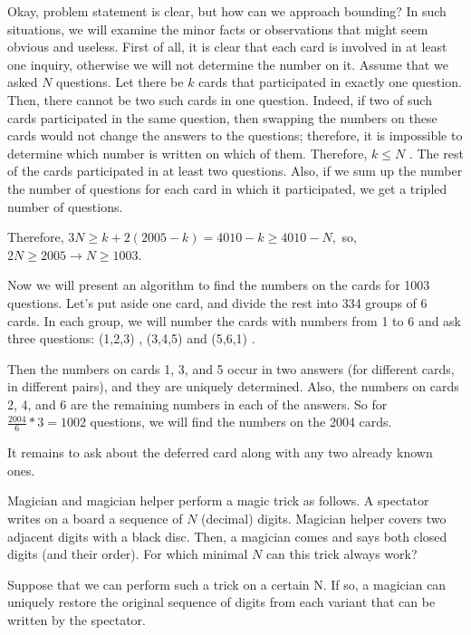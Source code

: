 \sol Okay, problem statement is clear, but how can we approach bounding? In such situations, we will examine the minor facts or observations that might seem obvious and useless. First of all, it is clear that each card is involved in at least one inquiry, otherwise we will not determine the number on it. Assume that we asked $N$ questions. Let there be $k$ cards that participated in exactly one question. Then, there cannot be two such cards in one question. Indeed, if two of such cards participated in the same question, then swapping the numbers on these cards would not change the answers to the questions; therefore, it is impossible to determine which number is written on which of them. Therefore, $k\leq N$ . The rest of the cards participated in at least two questions. Also, if we sum up the number the number of questions for each card in which it participated, we get a tripled number of questions.

Therefore, $3N \geq k + 2(2005-k) = 4010-k \geq 4010-N ,$ so, $2N \geq 2005 \rightarrow  N\geq 1003$. 

Now we will present an algorithm to find the numbers on the cards for 1003 questions. Let's put aside one card, and divide the rest into 334 groups of 6 cards. In each group, we will number the cards with numbers from 1 to 6 and ask three questions: (1,2,3) , (3,4,5) and (5,6,1) .

Then the numbers on cards 1, 3, and 5 occur in two answers (for different cards, in different pairs), and they are uniquely determined. Also, the numbers on cards 2, 4, and 6 are the remaining numbers in each of the answers. So for $\frac{2004}{6} * 3 = 1002$ questions, we will find the numbers on the 2004 cards.

It remains to ask about the deferred card along with any two already known ones.

\begin{example} [Russia 1997]
    Magician and magician helper perform a magic trick as follows. A spectator writes on a board a sequence of $N$ (decimal) digits. Magician helper covers two adjacent digits with a black disc. Then, a magician comes and says both closed digits (and their order). For which minimal $N$ can this trick always work? 
\end{example}

\sol Suppose that we can perform such a trick on a certain N. If so, a magician can uniquely restore the original sequence of digits from each variant that can be written by the spectator. 


